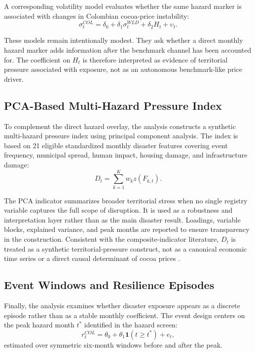 \documentclass[11pt]{article}
\begin{document}
A corresponding volatility model evaluates whether the same hazard marker is associated with changes in Colombian cocoa-price instability:
\begin{equation}
\sigma^{COL}_{t} = \delta_0 + \delta_1 \sigma^{WLD}_{t} + \delta_2 H_t + \upsilon_t.
\label{eq:hazard_vol_overlay}
\end{equation}

These models remain intentionally modest. They ask whether a direct monthly hazard marker adds information after the benchmark channel has been accounted for. The coefficient on $H_t$ is therefore interpreted as evidence of territorial pressure associated with exposure, not as an autonomous benchmark-like price driver.

\subsection{PCA-Based Multi-Hazard Pressure Index}


To complement the direct hazard overlay, the analysis constructs a synthetic multi-hazard pressure index using principal component analysis. The index is based on 21 eligible standardized monthly disaster features covering event frequency, municipal spread, human impact, housing damage, and infrastructure damage:
\begin{equation}
D_t = \sum_{k=1}^{K} w_k z(F_{k,t}).
\label{eq:pca_indicator}
\end{equation}

The PCA indicator summarizes broader territorial stress when no single registry variable captures the full scope of disruption. It is used as a robustness and interpretation layer rather than as the main disaster result. Loadings, variable blocks, explained variance, and peak months are reported to ensure transparency in the construction. Consistent with the composite-indicator literature, $D_t$ is treated as a synthetic territorial-pressure construct, not as a canonical economic time series or a direct causal determinant of cocoa prices \citep{Parsons2021,Garschagen2021}.

\subsection{Event Windows and Resilience Episodes}

Finally, the analysis examines whether disaster exposure appears as a discrete episode rather than as a stable monthly coefficient. The event design centers on the peak hazard month $t^{*}$ identified in the hazard screen:
\begin{equation}
r^{COL}_{t} = \theta_0 + \theta_1 \mathbf{1}(t \ge t^{*}) + e_t,
\label{eq:event_shift}
\end{equation}
estimated over symmetric six-month windows before and after the peak.
\end{document}
